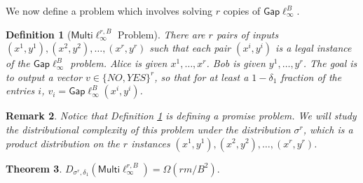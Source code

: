 \documentclass[twoside,leqno,twocolumn]{article}
\newtheorem{definition}{Definition}[section]
\newtheorem{remark}{Remark}[section]
\newtheorem{theorem}{Theorem}[section]
\newtheorem{definition}[theorem]{Definition}
\newtheorem{remark}[theorem]{Remark}
\newcommand{\gaplinf}{\mathsf{Gap}\ell_{\infty}}
\newcommand{\multiLinf}{\mathsf{Multi}\ell_{\infty}}
\begin{document}
We now define a problem which involves solving $r$ copies of $\gaplinf^B$. 
\begin{definition}[$\multiLinf^{r,B}$ Problem]\label{def:multi} There are $r$ pairs of
  inputs $(x^1,y^1),(x^2,y^2),\ldots,(x^r,y^r)$ such that each pair
  $(x^i,y^i)$ is a legal instance of the $\gaplinf^B$ problem. Alice
  is given $x^1, \ldots, x^{r}$.  Bob is given $y^1, \ldots, y^r$.
  The goal is to output a vector $v \in \{NO,YES\}^r$, so that for at
  least a $1-\delta_1$ fraction of the entries $i$, 
  $v_i = \gaplinf^B(x^i, y^i)$.
\end{definition}
\begin{remark}
Notice that Definition \ref{def:multi} is defining a promise problem. We will 
study the distributional complexity of this problem under the distribution
$\sigma^r$, which is a product distribution on 
the $r$ instances $(x^1, y^1), (x^2, y^2), \ldots, (x^r, y^r)$. 
\end{remark}
\begin{theorem}\label{thm:theMain}
$D_{\sigma^r, \delta_1}(\multiLinf^{r,B}) = \Omega(rm/B^2).$
\end{theorem}
\end{document}
